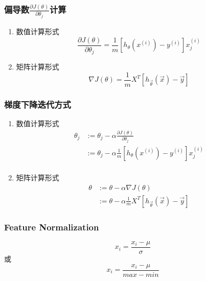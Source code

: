 \subsubsection{偏导数$\frac{\partial J(\theta)}{\partial \theta_j}$计算}
\begin{enumerate}
\item 数值计算形式
\begin{equation}
	\frac{\partial J(\theta)}{\partial \theta_j} =
	    \frac{1}{m} \left[ h_\theta(x^{(i)}) - y^{(i)} \right] x_j^{(i)}
\end{equation}

\item 矩阵计算形式
\begin{equation}
	\nabla J(\theta) = \frac{1}{m} X^T \left[h_{\vec{\theta}}(\vec{x}) - \vec{y}\right]
\end{equation}
\end{enumerate}


\subsubsection{梯度下降迭代方式}
\begin{enumerate}
\item 数值计算形式
\begin{equation}\begin{aligned}
	\theta_j &:= \theta_j - \alpha\frac{\partial J(\theta)}{\partial \theta_j} \\
		&:= \theta_j - \alpha \frac{1}{m} \left[h_\theta(x^{(i)}) - y^{(i)}\right] x_j^{(i)} \\
\end{aligned}\end{equation}

\item 矩阵计算形式
\begin{equation}\begin{aligned}
	\theta &:= \theta - \alpha\nabla J(\theta) \\
		&:= \theta - \alpha \frac{1}{m} X^T \left[ h_{\vec{\theta}}(\vec{x}) - \vec{y}\right]
\end{aligned}\end{equation}
\end{enumerate}



\subsubsection{Feature Normalization}
\begin{equation}
	x_i = \frac{x_i - \mu}{\sigma}
\end{equation}
或
\begin{equation}
	x_i = \frac{x_i - \mu}{max - min}
\end{equation}



